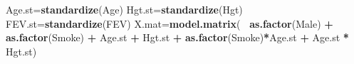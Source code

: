 \documentclass[
]{article}
\newenvironment{Shaded}{\begin{snugshade}}{\end{snugshade}}
\newcommand{\KeywordTok}[1]{\textcolor[rgb]{0.13,0.29,0.53}{\textbf{#1}}}
\newcommand{\NormalTok}[1]{#1}
\newcommand{\OperatorTok}[1]{\textcolor[rgb]{0.81,0.36,0.00}{\textbf{#1}}}
\newcommand{\StringTok}[1]{\textcolor[rgb]{0.31,0.60,0.02}{#1}}
\begin{document}
\begin{Shaded}
\begin{Highlighting}[]
\NormalTok{  Age.st=}\KeywordTok{standardize}\NormalTok{(Age)}
\NormalTok{  Hgt.st=}\KeywordTok{standardize}\NormalTok{(Hgt)}
\NormalTok{  FEV.st=}\KeywordTok{standardize}\NormalTok{(FEV)}
\NormalTok{  X.mat=}\KeywordTok{model.matrix}\NormalTok{(}\OperatorTok{~}\StringTok{ }\KeywordTok{as.factor}\NormalTok{(Male) }\OperatorTok{+}\StringTok{ }\KeywordTok{as.factor}\NormalTok{(Smoke) }\OperatorTok{+}\StringTok{ }\NormalTok{Age.st }\OperatorTok{+}\StringTok{ }\NormalTok{Hgt.st }\OperatorTok{+}\StringTok{ }\KeywordTok{as.factor}\NormalTok{(Smoke)}\OperatorTok{*}\NormalTok{Age.st }\OperatorTok{+}\StringTok{ }\NormalTok{Age.st }\OperatorTok{*}\StringTok{ }\NormalTok{Hgt.st)}
\end{Highlighting}
\end{Shaded}
\end{document}
